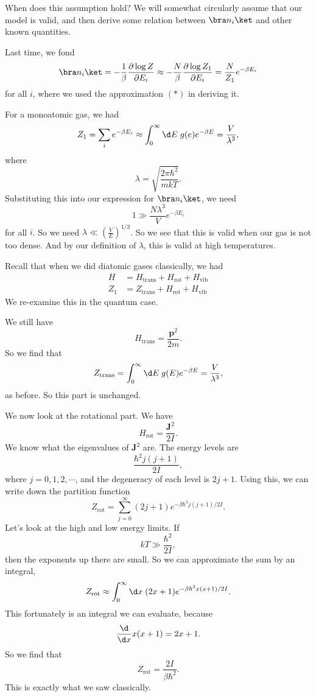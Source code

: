 \documentclass[a4paper]{article}
\begin{document}
When does this assumption hold? We will somewhat circularly assume that our model is valid, and then derive some relation between $\bra n_i \ket$ and other known quantities.

Last time, we fond
\[
  \bra n_i\ket = - \frac{1}{\beta} \frac{\partial \log Z}{\partial E_i} \approx -\frac{N}{\beta} \frac{\partial \log Z_1}{\partial E_i} = \frac{N}{Z_1} e^{-\beta E_i}
\]
for all $i$, where we used the approximation $(*)$ in deriving it.

For a monoatomic gas, we had
\[
  Z_1 = \sum_i e^{-\beta E_i} \approx \int_0^\infty \d E \; g(e) e^{-\beta E} = \frac{V}{\lambda^3},
\]
where
\[
  \lambda = \sqrt{\frac{2\pi \hbar^2}{mkT}}.
\]
Substituting this into our expression for $\bra n_i\ket$, we need
\[
  1 \gg \frac{N \lambda^3}{V} e^{-\beta E_i}
\]
for all $i$. So we need $\lambda \ll \left(\frac{V}{E}\right)^{1/3}$. So we see that this is valid when our gas is not too dense. And by our definition of $\lambda$, this is valid at high temperatures.

Recall that when we did diatomic gases classically, we had
\begin{align*}
  H &= H_{\mathrm{trans}} + H_{\mathrm{rot}} + H_{\mathrm{vib}}\\
  Z_1 &= Z_{\mathrm{trans}} + H_{\mathrm{rot}} + H_{\mathrm{vib}}
\end{align*}
We re-examine this in the quantum case.

We still have
\[
  H_{\mathrm{trans}} = \frac{\mathbf{p}^2}{2m}.
\]
So we find that
\[
  Z_{\mathrm{trans}} = \int_0^\infty \d E\; g(E) e^{-\beta E} = \frac{V}{\lambda^3},
\]
as before. So this part is unchanged.

We now look at the rotational part. We have
\[
  H_{\mathrm{rot}} = \frac{\mathbf{J}^2}{2I}.
\]
We know what the eigenvalues of $\mathbf{J}^2$ are. The energy levels are
\[
  \frac{\hbar^2 j(j + 1)}{2I},
\]
where $j = 0, 1, 2, \cdots$, and the degeneracy of each level is $2j + 1$. Using this, we can write down the partition function
\[
  Z_{\mathrm{rot}} = \sum_{j = 0}^\infty (2j + 1) e^{-\beta \hbar^3 j(j + 1)/2I}.
\]
Let's look at the high and low energy limits. If
\[
  kT \gg \frac{\hbar^2}{2I},
\]
then the exponents up there are small. So we can approximate the sum by an integral,
\[
  Z_{\mathrm{rot}} \approx \int_0^\infty \d x\; (2x + 1) e^{-\beta \hbar^3 x(x + 1)/2I}.
\]
This fortunately is an integral we can evaluate, because
\[
  \frac{\d}{\d x} x(x + 1) = 2x + 1.
\]
So we find that
\[
  Z_{\mathrm{rot}} = \frac{2I}{\beta \hbar^2}.
\]
This is exactly what we saw classically.
\end{document}

